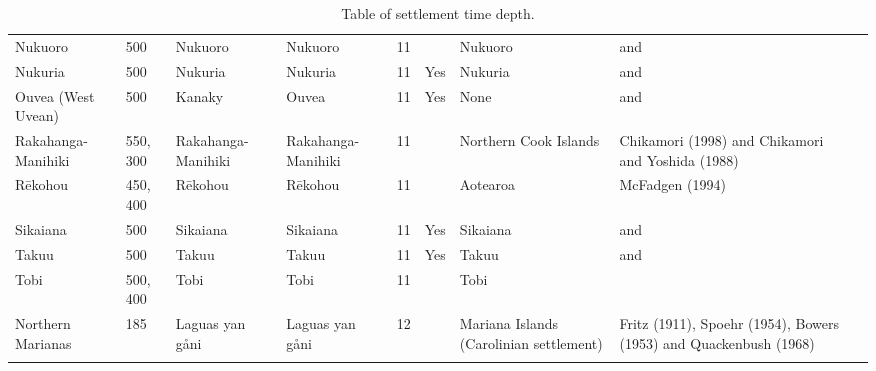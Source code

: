 \begin{longtable}{p{2cm}p{2cm}p{2cm}p{2cm}p{2cm}p{2cm}p{2cm}p{2cm}p{2cm}}
  Nukuoro & 500 & Nukuoro & Nukuoro & 11 &  & Nukuoro & \citet{kirch2012basline} and \citet{carson2012recent} &  \\ 
  Nukuria & 500 & Nukuria & Nukuria & 11 & Yes & Nukuria & \citet{kirch2012basline} and \citet{carson2012recent} &  \\ 
  Ouvea (West Uvean) & 500 & Kanaky & Ouvea & 11 & Yes & None & \citet{kirch2012basline} and \citet{carson2012recent} &  \\ 
  Rakahanga-Manihiki & 550, 300 & Rakahanga-Manihiki & Rakahanga-Manihiki & 11 &  & Northern Cook Islands & Chikamori (1998) and Chikamori and Yoshida (1988) & \citet{rieth_cochrane_2018} \\ 
  Rēkohou & 450, 400 & Rēkohou & Rēkohou & 11 &  & Aotearoa & McFadgen (1994) & \citet{rieth_cochrane_2018} \\ 
  Sikaiana & 500 & Sikaiana & Sikaiana & 11 & Yes & Sikaiana & \citet{kirch2012basline} and \citet{carson2012recent} &  \\ 
  Takuu & 500 & Takuu & Takuu & 11 & Yes & Takuu & \citet{kirch2012basline} and \citet{carson2012recent} &  \\ 
  Tobi & 500, 400 & Tobi & Tobi & 11 &  & Tobi & \citet{intoh2007reconnaissance} &  \\ 
  Northern Marianas & 185 & Laguas yan gåni & Laguas yan gåni & 12 &  & Mariana Islands (Carolinian settlement) & Fritz (1911), Spoehr (1954), Bowers (1953) and Quackenbush (1968) & \citet{ellis2012saipan} \\ 
   \bottomrule
\caption{Table of settlement time depth.} 
\label{appendix_dates_xtable}
\end{longtable}
